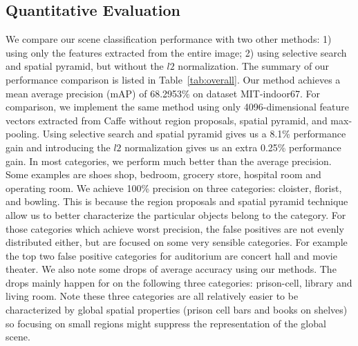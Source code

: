 \subsection{Quantitative Evaluation}
We compare our scene classification performance with two other methods: 1) using only the
features extracted from the entire image; 2) using selective search and spatial pyramid, but without the
$l2$ normalization. The summary of our performance comparison is listed in Table~\ref{tab:overall}.
Our method achieves a mean average precision (mAP) of 68.2953\% on dataset
MIT-indoor67. For comparison, we implement the same method using only 4096-dimensional
feature vectors extracted from Caffe without region proposals, spatial pyramid, and max-pooling.
Using selective search and spatial pyramid gives us a 8.1\% performance gain and introducing
the $l2$ normalization gives us an extra 0.25\% performance gain. In most categories, we perform much
better than the average precision. Some examples are shoes shop, bedroom, grocery store, hospital room and operating
room. We achieve 100\% precision on three categories: cloister, florist, and bowling. This is because the region proposals and spatial pyramid technique
allow us to better characterize the particular objects belong to the category. For those categories which achieve worst precision, the false positives are
not evenly distributed either, but are focused on some very sensible categories. For example the top two false positive categories for auditorium are concert hall
and movie theater.
We also note some drops of average accuracy using our methods. The drops mainly happen for on the following three categories: prison-cell, library and living room.
Note these three categories are all relatively easier to be characterized by global spatial properties (prison cell bars and books on shelves) so focusing on small regions
might suppress the representation of the global scene.

